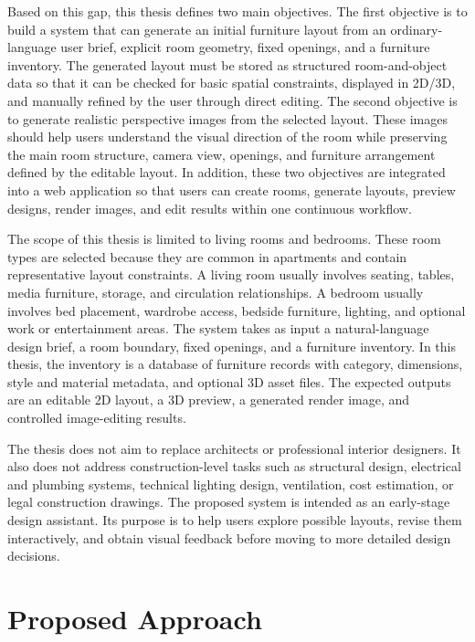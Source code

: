Based on this gap, this thesis defines two main objectives. The first objective is to build a system that can generate an initial furniture layout from an ordinary-language user brief, explicit room geometry, fixed openings, and a furniture inventory. The generated layout must be stored as structured room-and-object data so that it can be checked for basic spatial constraints, displayed in 2D/3D, and manually refined by the user through direct editing. The second objective is to generate realistic perspective images from the selected layout. These images should help users understand the visual direction of the room while preserving the main room structure, camera view, openings, and furniture arrangement defined by the editable layout. In addition, these two objectives are integrated into a web application so that users can create rooms, generate layouts, preview designs, render images, and edit results within one continuous workflow.

The scope of this thesis is limited to living rooms and bedrooms. These room types are selected because they are common in apartments and contain representative layout constraints. A living room usually involves seating, tables, media furniture, storage, and circulation relationships. A bedroom usually involves bed placement, wardrobe access, bedside furniture, lighting, and optional work or entertainment areas. The system takes as input a natural-language design brief, a room boundary, fixed openings, and a furniture inventory. In this thesis, the inventory is a database of furniture records with category, dimensions, style and material metadata, and optional 3D asset files. The expected outputs are an editable 2D layout, a 3D preview, a generated render image, and controlled image-editing results.

The thesis does not aim to replace architects or professional interior designers. It also does not address construction-level tasks such as structural design, electrical and plumbing systems, technical lighting design, ventilation, cost estimation, or legal construction drawings. The proposed system is intended as an early-stage design assistant. Its purpose is to help users explore possible layouts, revise them interactively, and obtain visual feedback before moving to more detailed design decisions.

\section{Proposed Approach}

